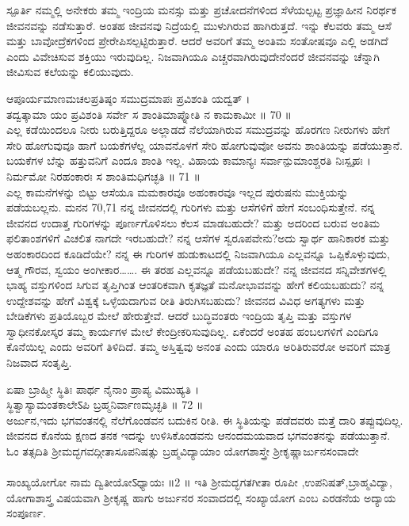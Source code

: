  ಸ್ಪೂರ್ತಿ 
 ನಮ್ಮಲ್ಲಿ ಅನೇಕರು ತಮ್ಮ ಇಂದ್ರಿಯ ಮನಸ್ಸು ಮತ್ತು ಪ್ರಚೋದನೆಗಳಿಂದ ಸೆಳೆಯಲ್ಪಟ್ಟ ಪ್ರಜ್ಞಾಹೀನ ನಿರರ್ಥಕ   ಜೀವನವನ್ನು ನಡೆಸುತ್ತಾರೆ. ಅಂತಹ ಜೀವನವು ನಿದ್ರೆಯಲ್ಲಿ  ಮುಳುಗಿರುವ ಹಾಗಿರುತ್ತದೆ. ಇನ್ನು ಕೆಲವರು ತಮ್ಮ ಆಸೆ ಮತ್ತು ಬಾವೋದ್ರೆಕಗಳಿಂದ ಪ್ರೇರೇಪಿಸಲ್ಪಟ್ಟಿರುತ್ತಾರೆ. ಆದರೆ ಅವರಿಗೆ ತಮ್ಮ ಅಂತಿಮ ಸಂತೋಷವೂ ಎಲ್ಲಿ ಅಡಗಿದೆ ಎಂದು ವಿವೇಚಿಸುವ ಶಕ್ತಿಯು ಇರುವುದಿಲ್ಲ. ನಿಜವಾಗಿಯೂ ಎಚ್ಚರವಾಗಿರುವುದೇನೆಂದರೆ ಜೀವನವನ್ನು ಚೆನ್ನಾಗಿ ಜೀವಿಸುವ ಕಲೆಯನ್ನು ಕಲಿಯುವುದು.
 
ಆಪೂರ್ಯಮಾಣಮಚಲಪ್ರತಿಷ್ಠಂ ಸಮುದ್ರಮಾಪಃ ಪ್ರವಿಶಂತಿ ಯದ್ವತ್ ।\\
ತದ್ವತ್ಕಾಮಾ ಯಂ ಪ್ರವಿಶಂತಿ ಸರ್ವೇ ಸ ಶಾಂತಿಮಾಪ್ನೋತಿ ನ ಕಾಮಕಾಮೀ ॥ 70 ॥\\
 ಎಲ್ಲ ಕಡೆಯಿಂದಲೂ ನೀರು ಬರುತ್ತಿದ್ದರೂ ಅಲ್ಲಾಡದೆ ನೆಲೆಯಾಗಿರುವ ಸಮುದ್ರವನ್ನು ಹೊರಗಣ ನೀರುಗಳು ಹೇಗೆ ಸೇರಿ ಹೋಗುವುವೂ ಹಾಗೆ ಬಯಕೆಗಳೆಲ್ಲ ಯಾವನೊಳಗೆ ಸೇರಿ ಹೋಗುವುವೋ ಅವನು ಶಾಂತಿಯನ್ನು ಪಡೆಯುತ್ತಾನೆ. ಬಯಕೆಗಳ ಬೆನ್ನು ಹತ್ತುವನಿಗೆ ಎಂದೂ ಶಾಂತಿ ಇಲ್ಲ.
ವಿಹಾಯ ಕಾಮಾನ್ಯಃ ಸರ್ವಾನ್ಪುಮಾಂಶ್ಚರತಿ ನಿಃಸ್ಪೃಹಃ ।\\
ನಿರ್ಮಮೋ ನಿರಹಂಕಾರಃ ಸ ಶಾಂತಿಮಧಿಗಚ್ಛತಿ ॥ 71 ॥\\
 ಎಲ್ಲ ಕಾಮನೆಗಳನ್ನು ಬಿಟ್ಟು ಆಸೆಯೂ ಮಮಕಾರವೂ ಅಹಂಕಾರವೂ ಇಲ್ಲದ ಪುರುಷನು ಮುಕ್ತಿಯನ್ನು ಪಡೆಯಬಲ್ಲನು.
ಮನನ 70,71
 ನನ್ನ ಜೀವನದಲ್ಲಿ ಗುರಿಗಳು ಮತ್ತು ಆಸೆಗಳಿಗೆ ಹೇಗೆ ಸಂಬಂಧಿಸುತ್ತೇನೆ. ನನ್ನ ಜೀವನದ ಉದಾತ್ತ   ಗುರಿಗಳನ್ನು ಪೂರ್ಣಗೊಳಿಸಲು ಕೆಲಸ ಮಾಡಬಹುದೇ? ಮತ್ತು ಅದರಿಂದ ಬರುವ ಅಂತಿಮ ಫಲಿತಾಂಶಗಳಿಗೆ ವಿಚಲಿತ ನಾಗದೇ ಇರಬಹುದೇ? ನನ್ನ ಆಸೆಗಳ ಸ್ವರೂಪವೇನು?ಅದು ಸ್ವಾರ್ಥ ಹಾನಿಕಾರಕ ಮತ್ತು ಅಹಂಕಾರದಿಂದ ಕೂಡಿದೆಯೇ?
 ನನ್ನ ಈ ಗುರಿಗಳ ಹುಡುಕಾಟದಲ್ಲಿ ನಿಜವಾಗಿಯೂ ಎಲ್ಲವನ್ನೂ ಒಪ್ಪಿಕೊಳ್ಳುವುದು, ಆತ್ಮ ಗೌರವ, ಸ್ವಯಂ  ಅಂಗೀಕಾರ……. ಈ ತರಹ ಎಲ್ಲವನ್ನೂ ಪಡೆಯಬಹುದೇ? ನನ್ನ ಜೀವನದ ಸನ್ನಿವೇಶಗಳಲ್ಲಿ ಭಾಹ್ಯ ವಸ್ತುಗಳಿಂದ ಸಿಗುವ ತೃಪ್ತಿಗಿಂತ ಆಂತರಿಕವಾಗಿ ಕೃತಜ್ಞತೆ ಮನೋಭಾವವನ್ನು ಹೇಗೆ ಕಲಿಯಬಹುದು? ನನ್ನ ಉದ್ದೇಶವನ್ನು ಹೇಗೆ ವಿಶ್ವಕ್ಕೆ ಒಳ್ಳೆಯದಾಗುವ ರೀತಿ ತಿರುಗಿಸಬಹುದು?
 ಜೀವನದ ವಿವಿಧ ಅಗತ್ಯಗಳು ಮತ್ತು ಬೇಡಿಕೆಗಳು ಪ್ರತಿಯೊಬ್ಬರ ಮೇಲೆ ಹೇರುತ್ತೇವೆ. ಆದರೆ ಬುದ್ಧಿವಂತರು ಇಂದ್ರಿಯ ತೃಪ್ತಿ ಮತ್ತು ವಸ್ತುಗಳ ಸ್ವಾಧೀನಕೋಸ್ಕರ  ತಮ್ಮ ಕಾರ್ಯಗಳ ಮೇಲೆ ಕೇಂದ್ರೀಕರಿಸುವುದಿಲ್ಲ. ಏಕೆಂದರೆ ಅಂತಹ ಹಂಬಲಗಳಿಗೆ ಎಂದಿಗೂ ಕೊನೆಯಿಲ್ಲ ಎಂದು ಅವರಿಗೆ ತಿಳಿದಿದೆ.
 ತಮ್ಮ ಅಸ್ತಿತ್ವವು ಅನಂತ ಎಂದು ಯಾರೂ ಅರಿತಿರುವರೋ ಅವರಿಗೆ ಮಾತ್ರ ನಿಜವಾದ ಸಂತೃಪ್ತಿ.

ಏಷಾ ಬ್ರಾಹ್ಮೀ ಸ್ಥಿತಿಃ ಪಾರ್ಥ ನೈನಾಂ ಪ್ರಾಪ್ಯ ವಿಮುಹ್ಯತಿ ।\\
ಸ್ಥಿತ್ವಾಸ್ಯಾಮಂತಕಾಲೇऽಪಿ ಬ್ರಹ್ಮನಿರ್ವಾಣಮೃಚ್ಛತಿ ॥ 72 ॥\\
 ಅರ್ಜುನ,ಇದು ಭಗವಂತನಲ್ಲಿ ನೆಲೆಗೊಂಡವನ ಬದುಕಿನ ರೀತಿ. ಈ ಸ್ಥಿತಿಯನ್ನು ಪಡೆದವರು ಮತ್ತೆ ದಾರಿ ತಪ್ಪುವುದಿಲ್ಲ. ಜೀವನದ ಕೊನೆಯ ಕ್ಷಣದ ತನಕ ಇದನ್ನು ಉಳಿಸಿಕೊಂಡವನು ಆನಂದಮಯವಾದ ಭಗವಂತನನ್ನು ಪಡೆಯುತ್ತಾನೆ.
ಓಂ ತತ್ಸದಿತಿ ಶ್ರೀಮದ್ಭಗವದ್ಗೀತಾಸೂಪನಿಷತ್ಸು ಬ್ರಹ್ಮವಿದ್ಯಾಯಾಂ ಯೋಗಶಾಸ್ತ್ರೇ ಶ್ರೀಕೃಷ್ಣಾರ್ಜುನಸಂವಾದೇ\\
\\
ಸಾಂಖ್ಯಯೋಗೋ ನಾಮ ದ್ವಿತೀಯೋऽಧ್ಯಾಯಃ ॥2 ॥
ಇತಿ ಶ್ರೀಮದ್ಭಗತಗೀತಾ ರೂಪೀ ,ಉಪನಿಷತ್,ಬ್ರಾಹ್ಮವಿದ್ಯಾ, ಯೋಗಾಶಾಸ್ತ್ರ ವಿಷಯವಾಗಿ ಶ್ರೀಕೃಷ್ಣ ಹಾಗು ಅರ್ಜುನರ ಸಂವಾದದಲ್ಲಿ ಸಂಖ್ಯಾಯೋಗ ಎಂಬ ಎರಡನೆಯ ಅದ್ಯಾಯ ಸಂಪೂರ್ಣ.
